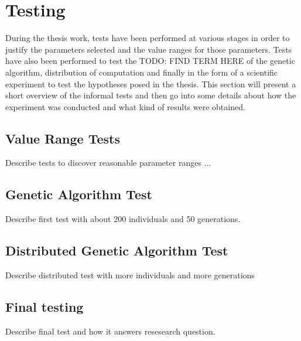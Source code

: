 \section{Testing}
\label{Testing}
During the thesis work, tests have been performed at various stages in order to justify the parameters selected and the value ranges for those parameters. Tests have also been performed to test the TODO: FIND TERM HERE of the genetic algorithm, distribution of computation and finally in the form of a scientific experiment to test the hypotheses posed in the thesis. This section will present a short overview of the informal tests and then go into some details about how the experiment was conducted and what kind of results were obtained. 

\subsection{Value Range Tests}
Describe tests to discover reasonable parameter ranges ...

\subsection{Genetic Algorithm Test}
Describe first test with about 200 individuals and 50 generations.

\subsection{Distributed Genetic Algorithm Test}
Describe distributed test with more individuals and more generations

\subsection{Final testing}
Describe final test and how it answers resesearch question.
